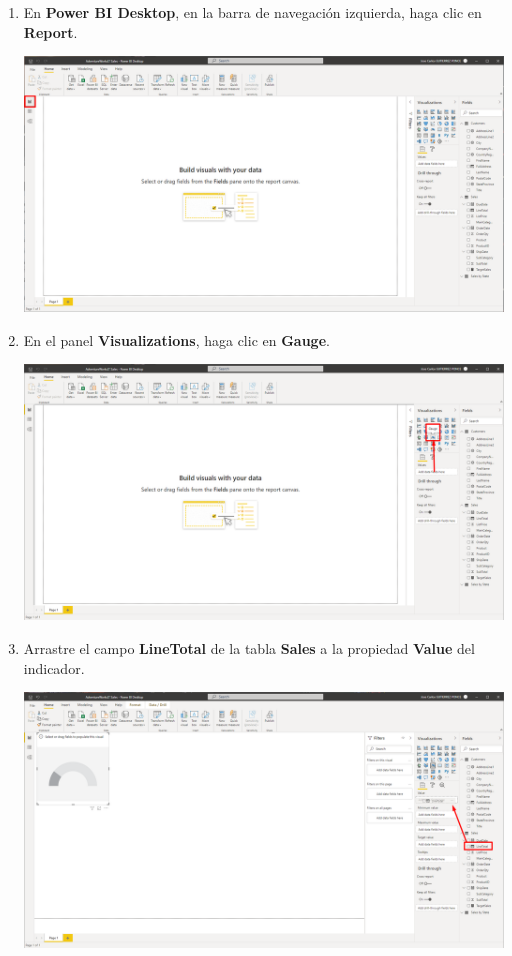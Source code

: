 \documentclass[12pt,letterpaper]{article}
\newcommand\tab[1][1cm]{\hspace*{#1}}
\begin{document}
    \begin{enumerate}[\tab 1.]
        \item En \textbf{Power BI Desktop}, en la barra de navegación izquierda, haga clic en \textbf{Report}.
        \begin{center}
            \includegraphics[width=13cm]{./img/img77.png}
        \end{center}
        \item En el panel \textbf{Visualizations}, haga clic en \textbf{Gauge}.
        \begin{center}
            \includegraphics[width=13cm]{./img/img78.png}
        \end{center}
        \item Arrastre el campo \textbf{LineTotal} de la tabla \textbf{Sales} a la propiedad \textbf{Value} del indicador.
        \begin{center}
            \includegraphics[width=13cm]{./img/img79.png}

\end{center}
\end{enumerate}
\end{document}
